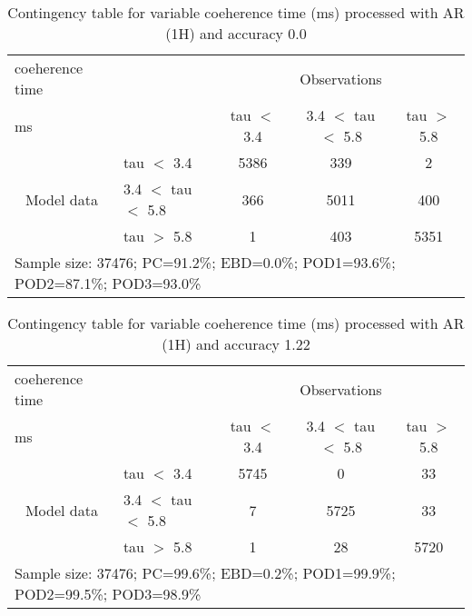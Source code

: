 \documentclass[11pt,english]{article}
\begin{document}
\begin{table}[]
\begin{center}
\begin{tabular}{llccc}
\hline
{coeherence time}                                       &                                                    & \multicolumn{3}{c}{Observations}                 \\
{ms}                                       &                             & tau $<$ 3.4   & 3.4 $<$ tau $<$ 5.8 & tau $>$ 5.8 \\
\hline
\multicolumn{1}{c}{\multirow{3}{*}{Model data}}  & tau $<$ 3.4             & 5386                & 339                       & 2              \\
                                                 & 3.4  $<$ tau $<$ 5.8 & 366                & 5011                       & 400              \\
                                                 & tau $>$ 5.8             & 1                & 403                       & 5351              \\
\hline
\multicolumn{5}{l}{Sample size: 37476; PC=91.2\%; EBD=0.0\%; POD1=93.6\%; POD2=87.1\%; POD3=93.0\%}
\end{tabular}
\end{center}
\caption{Contingency table for variable coeherence time (ms) processed with AR (1H) and accuracy 0.0}
\label{tab:contingencytauAFT}
\end{table}
\begin{table}[]
\begin{center}
\begin{tabular}{llccc}
\hline
{coeherence time}                                       &                                                    & \multicolumn{3}{c}{Observations}                 \\
{ms}                                       &                             & tau $<$ 3.4   & 3.4 $<$ tau $<$ 5.8 & tau $>$ 5.8 \\
\hline
\multicolumn{1}{c}{\multirow{3}{*}{Model data}}  & tau $<$ 3.4             & 5745                & 0                       & 33              \\
                                                 & 3.4  $<$ tau $<$ 5.8 & 7                & 5725                       & 33              \\
                                                 & tau $>$ 5.8             & 1                & 28                       & 5720              \\
\hline
\multicolumn{5}{l}{Sample size: 37476; PC=99.6\%; EBD=0.2\%; POD1=99.9\%; POD2=99.5\%; POD3=98.9\%}
\end{tabular}
\end{center}
\caption{Contingency table for variable coeherence time (ms) processed with AR (1H) and accuracy 1.22}
\label{tab:contingencytauAFT}
\end{table}
\end{document}
